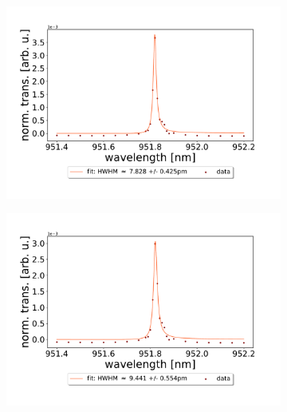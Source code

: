 \begin{figure}[h!]
    \centering
    \begin{subfigure}[b]{0.49\textwidth}
        \includegraphics[width=\textwidth]{figures/results/single fano fits/380um_M5_fit_1.pdf}
        \caption{}
        \label{fig:380um_M5_fit_1}
    \end{subfigure}
    \begin{subfigure}[b]{0.49\textwidth}
        \includegraphics[width=\textwidth]{figures/results/single fano fits/380um_M5_fit_2.pdf}
        \caption{}
        \label{fig:380um_M5_fit_2}
    \end{subfigure}
    \begin{subfigure}[b]{0.49\textwidth}

\end{subfigure}
\end{figure}
